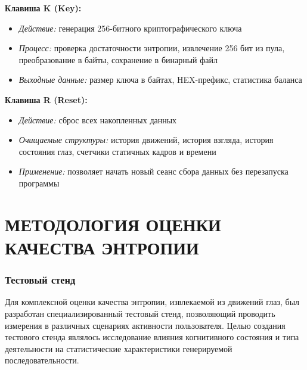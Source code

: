 \documentclass[14pt, a4paper]{extreport}
\let\oldchapter\chapter
\renewcommand{\chapter}{%
  \setcounter{subsection}{0}%
  \oldchapter%
}
\begin{document}
\textbf{Клавиша K (Key):}
\begin{itemize}
    \item \textit{Действие:} генерация 256-битного криптографического ключа
    \item \textit{Процесс:} проверка достаточности энтропии, извлечение 256 бит из пула, преобразование в байты, сохранение в бинарный файл
    \item \textit{Выходные данные:} размер ключа в байтах, HEX-префикс, статистика баланса
\end{itemize}

\textbf{Клавиша R (Reset):}
\begin{itemize}
    \item \textit{Действие:} сброс всех накопленных данных
    \item \textit{Очищаемые структуры:} история движений, история взгляда, история состояния глаз, счетчики статичных кадров и времени
    \item \textit{Применение:} позволяет начать новый сеанс сбора данных без перезапуска программы
\end{itemize}

\newpage
\chapter{МЕТОДОЛОГИЯ ОЦЕНКИ КАЧЕСТВА ЭНТРОПИИ}

\subsection{Тестовый стенд}

Для комплексной оценки качества энтропии, извлекаемой из движений глаз, был разработан специализированный тестовый стенд, позволяющий проводить измерения в различных сценариях активности пользователя. Целью создания тестового стенда являлось исследование влияния когнитивного состояния и типа деятельности на статистические характеристики генерируемой последовательности.
\end{document}
